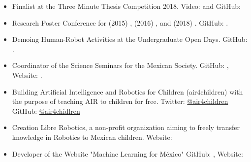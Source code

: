 \documentclass{mycv}
\begin{document}
\begin{itemize}
\item  Finalist at the Three Minute Thesis Competition 2018. Video: \href{https://www.youtube.com/watch?v=07ewRYcS-0g}{\faYoutube} and 
GitHub: \href{https://github.com/mxochicale/3mt}{\faGithubAlt} 

\item Research Poster Conference for 
(2015) \href{https://github.com/mxochicale/PhD/blob/master/posters/Research_Poster_Conference_UoB/2015/poster/poster.pdf}{\faImage}, 
(2016) \href{https://github.com/mxochicale/PhD/blob/master/posters/Research_Poster_Conference_UoB/2016/poster/poster.pdf}{\faImage}, and  
(2018) \href{https://github.com/mxochicale/PhD/blob/master/posters/Research_Poster_Conference_UoB/2018/poster/main/map479-poster-uob2018.pdf}{\faImage}.
GitHub: \href{https://github.com/mxochicale/PhD/tree/master/posters/Research_Poster_Conference_UoB}{\faGithubAlt}.
\item Demoing Human-Robot Activities at the Undergraduate Open Days. GitHub: \href{https://github.com/mxochicale/opendayuob-hridemo}{\faGithubAlt}. 
\item Coordinator of the Science Seminars for the Mexican Society.  GitHub: \href{https://github.com/MexicanSocietyUoB}{\faGithubAlt}, Website: \href{https://mexicansocietyuob.github.io/seminars/}{\faExternalLink}. 




\item Building Artificial Intelligence and Robotics for Children (air4children) with the purpose of teaching AIR to children for free. 
Twitter: \href{https://twitter.com/air4children}{\faTwitter @air4children} 
GitHub: \href{https://github.com/air4children}{\faGithubAlt @air4chidlren} 

\item Creation Libre Robotics, a non-profit organization aiming to freely transfer knowledge in Robotics to Mexican children.  Website: \href{https://sites.google.com/site/LibreRobotics/}{\faExternalLink}  

\item Developer of the Website "Machine Learning for M\'exico"
GitHub: \href{https://github.com/ML4MX}{\faGithubAlt}, Website: \href{https://ml4mx.github.io/website/}{\faExternalLink} 

\end{itemize}
\end{document}
